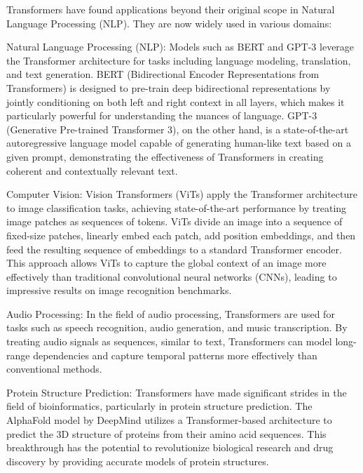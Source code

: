 Transformers have found applications beyond their original scope in Natural Language Processing (NLP). They are now widely used in various domains:

\par{Natural Language Processing (NLP):} Models such as BERT \cite{devlin2019bert} and GPT-3 \cite{brown2020language} leverage the Transformer architecture for tasks including language modeling, translation, and text generation. BERT (Bidirectional Encoder Representations from Transformers) is designed to pre-train deep bidirectional representations by jointly conditioning on both left and right context in all layers, which makes it particularly powerful for understanding the nuances of language. GPT-3 (Generative Pre-trained Transformer 3), on the other hand, is a state-of-the-art autoregressive language model capable of generating human-like text based on a given prompt, demonstrating the effectiveness of Transformers in creating coherent and contextually relevant text.

\par{Computer Vision:} Vision Transformers (ViTs) \cite{dosovitskiy2021image} apply the Transformer architecture to image classification tasks, achieving state-of-the-art performance by treating image patches as sequences of tokens. ViTs divide an image into a sequence of fixed-size patches, linearly embed each patch, add position embeddings, and then feed the resulting sequence of embeddings to a standard Transformer encoder. This approach allows ViTs to capture the global context of an image more effectively than traditional convolutional neural networks (CNNs), leading to impressive results on image recognition benchmarks.

\par{Audio Processing:} In the field of audio processing, Transformers are used for tasks such as speech recognition, audio generation, and music transcription. By treating audio signals as sequences, similar to text, Transformers can model long-range dependencies and capture temporal patterns more effectively than conventional methods.

\par{Protein Structure Prediction:} Transformers have made significant strides in the field of bioinformatics, particularly in protein structure prediction. The AlphaFold model \cite{Jumper2021HighlyAP} by DeepMind utilizes a Transformer-based architecture to predict the 3D structure of proteins from their amino acid sequences. This breakthrough has the potential to revolutionize biological research and drug discovery by providing accurate models of protein structures.

